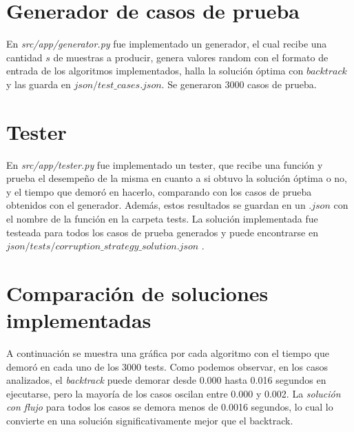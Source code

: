 \documentclass[10pt]{article} %
\begin{document}
	\section{Generador de casos de prueba}
	
	En \textit{src/app/generator.py} fue implementado un generador, el cual recibe una cantidad $ s $ de muestras a producir, genera valores random con el formato de entrada de los algoritmos implementados, halla la soluci\'on \'optima con $ backtrack $ y las guarda en $ json/test\_cases.json $. Se generaron 3000 casos de prueba.
	
	\section{Tester}
	En \textit{src/app/tester.py} fue implementado un tester, que recibe una funci\'on y prueba el desempe\~no de la misma en cuanto a si obtuvo la soluci\'on \'optima o no, y el tiempo que demor\'o en hacerlo, comparando con los casos de prueba obtenidos con el generador. Adem\'as, estos resultados se guardan en un $ .json $ con el nombre de la funci\'on en la carpeta tests. La soluci\'on implementada fue testeada para todos los casos de prueba generados y puede encontrarse en $ json/tests/corruption\_strategy\_solution.json $ .
	
	\section{Comparaci\'on de soluciones implementadas}          

    A continuaci\'on se muestra una gr\'afica por cada algoritmo con el tiempo que demor\'o en cada uno de los 3000 tests. Como podemos observar, en los casos analizados, el \textit{backtrack} puede demorar desde 0.000 hasta 0.016 segundos en ejecutarse, pero la mayor\'ia de los casos oscilan entre 0.000 y 0.002. La \textit{soluci\'on con flujo} para todos los casos se demora menos de 0.0016 segundos, lo cual lo convierte en una soluci\'on significativamente mejor que el backtrack.
    
\end{document}
